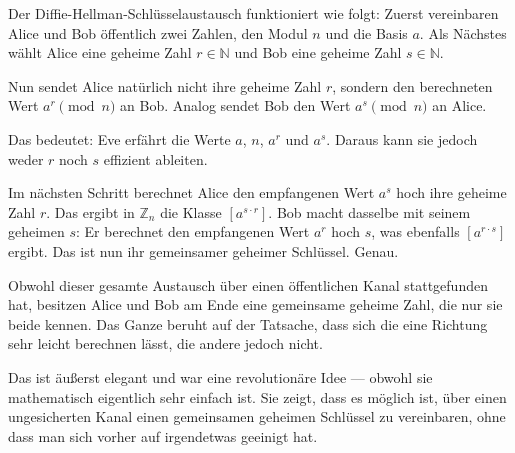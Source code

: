 \begin{spoken-clean}[00:20:33 - 00:22:40]
Der Diffie-Hellman-Schlüsselaustausch funktioniert wie folgt: Zuerst vereinbaren Alice und Bob öffentlich zwei Zahlen, den Modul $n$ und die Basis $a$. Als Nächstes wählt Alice eine geheime Zahl $r \in \mathbb{N}$ und Bob eine geheime Zahl $s \in \mathbb{N}$.

Nun sendet Alice natürlich nicht ihre geheime Zahl $r$, sondern den berechneten Wert $a^r \pmod n$ an Bob. Analog sendet Bob den Wert $a^s \pmod n$ an Alice.

Das bedeutet: Eve erfährt die Werte $a$, $n$, $a^r$ und $a^s$. Daraus kann sie jedoch weder $r$ noch $s$ effizient ableiten.
\end{spoken-clean}

\begin{spoken-clean}[00:22:40 - 00:25:21]
Im nächsten Schritt berechnet Alice den empfangenen Wert $a^s$ hoch ihre geheime Zahl $r$. Das ergibt in $\mathbb{Z}_n$ die Klasse $[a^{s \cdot r}]$. Bob macht dasselbe mit seinem geheimen $s$: Er berechnet den empfangenen Wert $a^r$ hoch $s$, was ebenfalls $[a^{r \cdot s}]$ ergibt. Das ist nun ihr gemeinsamer geheimer Schlüssel. Genau.

Obwohl dieser gesamte Austausch über einen öffentlichen Kanal stattgefunden hat, besitzen Alice und Bob am Ende eine gemeinsame geheime Zahl, die nur sie beide kennen. Das Ganze beruht auf der Tatsache, dass sich die eine Richtung sehr leicht berechnen lässt, die andere jedoch nicht.

Das ist äußerst elegant und war eine revolutionäre Idee --- obwohl sie mathematisch eigentlich sehr einfach ist. Sie zeigt, dass es möglich ist, über einen ungesicherten Kanal einen gemeinsamen geheimen Schlüssel zu vereinbaren, ohne dass man sich vorher auf irgendetwas geeinigt hat.
\end{spoken-clean}

